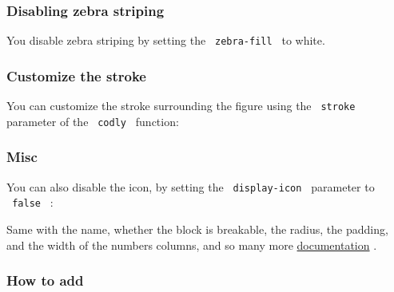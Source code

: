 \subsubsection{Disabling zebra striping}\label{disabling-zebra-striping}

You disable zebra striping by setting the \texttt{\ zebra-fill\ } to
white.

\begin{Shaded}
\begin{Highlighting}[]
\end{Highlighting}
\end{Shaded}

\subsubsection{Customize the stroke}\label{customize-the-stroke}

You can customize the stroke surrounding the figure using the
\texttt{\ stroke\ } parameter of the \texttt{\ codly\ } function:

\begin{Shaded}
\begin{Highlighting}[]
\end{Highlighting}
\end{Shaded}

\subsubsection{Misc}\label{misc}

You can also disable the icon, by setting the \texttt{\ display-icon\ }
parameter to \texttt{\ false\ } :

\begin{Shaded}
\begin{Highlighting}[]
\end{Highlighting}
\end{Shaded}

Same with the name, whether the block is breakable, the radius, the
padding, and the width of the numbers columns, and so many more
\href{https://raw.githubusercontent.com/Dherse/codly/main/docs.pdf}{documentation}
.

\subsubsection{How to add}\label{how-to-add}

